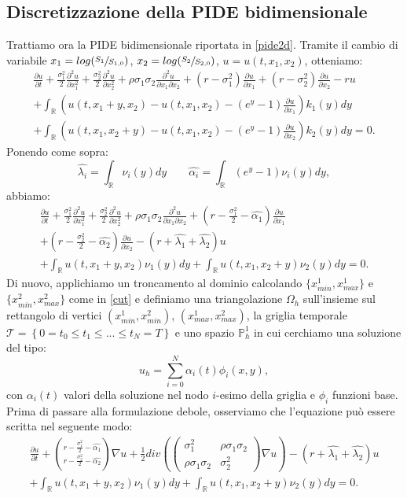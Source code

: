 \documentclass[a4paper,10pt]{report}
\newcommand{\der}[2]{\frac{\partial #1}{\partial #2}}
\newcommand{\dder}[2]{\frac{\partial^2 #1}{\partial #2^2}}
\newcommand{\dmix}[3]{\frac{\partial^2 #1}{\partial #2 \partial #3}}
\theoremstyle{plain}
\theoremstyle{definition}
\theoremstyle{remark}
\begin{document}
\subsection{Discretizzazione della PIDE bidimensionale}
Trattiamo ora la PIDE bidimensionale riportata in \ref{pide2d}. Tramite il cambio di variabile $x_1=log(\sfrac{S_1}{S_{1,0}})$, $x_2=log(\sfrac{S_2}{S_{2,0}})$, $u=u(t, x_1, x_2)$, otteniamo:
\begin{multline}
\der{u}{t}+\frac{\sigma_1^2}{2}\dder{u}{x_1}+\frac{\sigma_2^2}{2}\dder{u}{x_2}+\rho\sigma_1\sigma_2\dmix{u}{x_1}{x_2}+
\left(r-\sigma_1^2\right)\der{u}{x_1}+
\left(r-\sigma_2^2\right)\der{u}{x_2}-ru\\
+\int_\mathbb{R}\left( u(t,x_1+y,x_2)-u(t,x_1,x_2)-(e^y-1)\der{u}{x_1}\right)k_1(y)dy\\
+\int_\mathbb{R}\left( u(t,x_1,x_2+y)-u(t,x_1,x_2)-(e^y-1)\der{u}{x_2}\right)k_2(y)dy=0.
\label{pide2dcostcoeff}
\end{multline}
Ponendo come sopra:$$\hat{\lambda_i}=\int_\mathbb{R}\nu_i(y)dy \qquad \hat{\alpha_i}=\int_\mathbb{R}(e^y-1)\nu_i(y)dy,$$abbiamo:
\begin{multline}
\der{u}{t}+\frac{\sigma_1^2}{2}\dder{u}{x_1}+\frac{\sigma_2^2}{2}\dder{u}{x_2}+\rho\sigma_1\sigma_2\dmix{u}{x_1}{x_2}+
\left(r-\frac{\sigma_1^2}{2}-\hat{\alpha_1}\right)\der{u}{x_1}\\+
\left(r-\frac{\sigma_2^2}{2}-\hat{\alpha_2}\right)\der{u}{x_2}-(r+\hat{\lambda_1}+\hat{\lambda_2})u\\+
\int_\mathbb{R}u(t,x_1+y,x_2)\nu_1(y)dy+
\int_\mathbb{R}u(t,x_1,x_2+y)\nu_2(y)dy=0.
\label{pide2dcostcoeff2}
\end{multline}
Di nuovo, applichiamo un troncamento al dominio calcolando $\{x_{min}^1, x_{max}^1\}$ e $\{x_{min}^2, x_{max}^2\}$ come in \ref{cut} e definiamo una triangolazione $\Omega_h$ sull'insieme sul rettangolo di vertici $(x_{min}^1, x_{min}^2)$, $(x_{max}^1, x_{max}^2)$, la griglia temporale $\mathcal{T}=\left\{0= t_0\leq t_1\leq ... \leq t_N=T\right\}$ e uno spazio $\mathbb{P}_h^1$ in cui cerchiamo una soluzione del tipo: $$u_h=\sum_{i=0}^{N}\alpha_i(t) \phi_i(x,y),$$con $\alpha_i(t)$ valori della soluzione nel nodo $i$-esimo della griglia e $\phi_i$ funzioni base.
Prima di passare alla formulazione debole, osserviamo che l'equazione pu\`o essere scritta nel seguente modo:
\begin{multline}
\der{u}{t}+\binom{r-\frac{\sigma_1^2}{2}-\hat{\alpha_1}}{r-\frac{\sigma_2^2}{2}-\hat{\alpha_2}}\nabla u+\frac{1}{2}div\left(\left(\begin{matrix}\sigma_1^2 & \rho\sigma_1\sigma_2\\ \rho\sigma_1\sigma_2 & \sigma_2^2 \end{matrix}\right)\nabla u\right)-(r+\hat{\lambda_1}+\hat{\lambda_2})u\\
+\int_\mathbb{R}u(t,x_1+y,x_2)\nu_1(y)dy+
\int_\mathbb{R}u(t,x_1,x_2+y)\nu_2(y)dy=0.
\end{multline}
\end{document}
